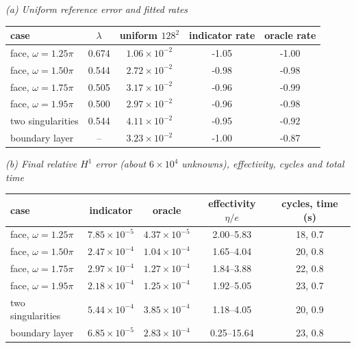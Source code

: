 \textit{(a) Uniform reference error and fitted rates}\\[2pt]
\begin{tabular}{l c c cc}
\toprule
case & $\lambda$ & uniform $128^2$ & indicator rate & oracle rate\\
\midrule
face, $\omega=1.25\pi$ & 0.674 & $1.06{\times}10^{-2}$ & -1.05 & -1.00\\
face, $\omega=1.50\pi$ & 0.544 & $2.72{\times}10^{-2}$ & -0.98 & -0.98\\
face, $\omega=1.75\pi$ & 0.505 & $3.17{\times}10^{-2}$ & -0.96 & -0.99\\
face, $\omega=1.95\pi$ & 0.500 & $2.97{\times}10^{-2}$ & -0.96 & -0.98\\
two singularities & 0.544 & $4.11{\times}10^{-2}$ & -0.95 & -0.92\\
boundary layer & -- & $3.23{\times}10^{-2}$ & -1.00 & -0.87\\
\bottomrule
\end{tabular}

\medskip
\textit{(b) Final relative $H^1$ error (about $6\times10^4$ unknowns), effectivity, cycles and total time}\\[2pt]
\begin{tabular}{l cc c c}
\toprule
case & indicator & oracle & effectivity $\eta/e$ & cycles, time (s)\\
\midrule
face, $\omega=1.25\pi$ & $7.85{\times}10^{-5}$ & $4.37{\times}10^{-5}$ & 2.00--5.83 & 18, 0.7\\
face, $\omega=1.50\pi$ & $2.47{\times}10^{-4}$ & $1.04{\times}10^{-4}$ & 1.65--4.04 & 20, 0.8\\
face, $\omega=1.75\pi$ & $2.97{\times}10^{-4}$ & $1.27{\times}10^{-4}$ & 1.84--3.88 & 22, 0.8\\
face, $\omega=1.95\pi$ & $2.18{\times}10^{-4}$ & $1.25{\times}10^{-4}$ & 1.92--5.05 & 23, 0.7\\
two singularities & $5.44{\times}10^{-4}$ & $3.85{\times}10^{-4}$ & 1.18--4.05 & 20, 0.9\\
boundary layer & $6.85{\times}10^{-5}$ & $2.83{\times}10^{-4}$ & 0.25--15.64 & 23, 0.8\\
\bottomrule
\end{tabular}
